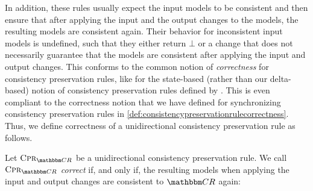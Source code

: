 In addition, these rules usually expect the input models to be consistent and then ensure that after applying the input and the output changes to the models, the resulting models are consistent again.
Their behavior for inconsistent input models is undefined, such that they either return $\bot$ or a change that does not necessarily guarantee that the models are consistent after applying the input and output changes.
This conforms to the common notion of \emph{correctness} for consistency preservation rules, like for the state-based (rather than our delta-based) notion of consistency preservation rules defined by \textcite{stevens2010sosym}.
This is even compliant to the correctness notion that we have defined for synchronizing consistency preservation rules in \autoref{def:consistencypreservationrulecorrectness}.
Thus, we define correctness of a unidirectional consistency preservation rule as follows.

\begin{definition}
    \label{def:unidirectionalconsistencypreservationrulecorrectness}
    Let $\consistencypreservationrule{\consistencyrelationset{CR}}$ be a unidirectional consistency preservation rule.
    We call $\consistencypreservationrule{\consistencyrelationset{CR}}$ \emph{correct} if, and only if, the resulting models when applying the input and output changes are consistent to $\consistencyrelationset{CR}$ again:
\end{definition}

